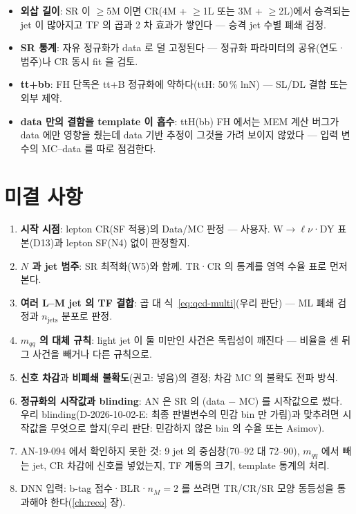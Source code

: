 \begin{note}
\begin{itemize}
\item \textbf{외삽 길이}: SR 이 $\ge5$M 이면 CR(4M + $\ge$1L 또는 3M + $\ge$2L)에서 승격되는 jet 이 많아지고 TF 의 곱과 2 차 효과가 쌓인다 — 승격 jet 수별 폐쇄 검정.
\item \textbf{SR 통계}: 자유 정규화가 data 로 덜 고정된다 — 정규화 파라미터의 공유(연도·범주)나 CR 동시 fit 을 검토.
\item \textbf{tt+bb}: FH 단독은 tt+B 정규화에 약하다(ttH: 50\,\% lnN) — SL/DL 결합 또는 외부 제약.
\item \textbf{data 만의 결함을 template 이 흡수}: ttH(bb) FH 에서는 MEM 계산 버그가 data 에만 영향을 줬는데 data 기반 추정이 그것을 가려 보이지 않았다
       — 입력 변수의 MC–data 를 따로 점검한다.
\end{itemize}
\end{note}

\section{미결 사항}\label{sec:qcd-open}
\begin{openq}
\begin{enumerate}
\item \textbf{시작 시점}: lepton CR(SF 적용)의 Data/MC 판정 — 사용자. W$\to\ell\nu$·DY 표본(D13)과 lepton SF(N4) 없이 판정할지.
\item \textbf{$N$ 과 jet 범주}: SR 최적화(W5)와 함께. TR·CR 의 통계를 영역 수율 표로 먼저 본다.
\item \textbf{여러 L–M jet 의 TF 결합}: 곱 대 식~\eqref{eq:qcd-multi}(우리 판단) — ML 폐쇄 검정과 $n_{\text{jets}}$ 분포로 판정.
\item \textbf{$m_{qq}$ 의 대체 규칙}: light jet 이 둘 미만인 사건은 독립성이 깨진다 — 비율을 센 뒤 그 사건을 빼거나 다른 규칙으로.
\item \textbf{신호 차감}과 \textbf{비폐쇄 불확도}(권고: 넣음)의 결정; 차감 MC 의 불확도 전파 방식.
\item \textbf{정규화의 시작값과 blinding}: AN 은 SR 의 (data $-$ MC) 를 시작값으로 썼다. 우리 blinding(D-2026-10-02-E: 최종 판별변수의 민감 bin 만 가림)과 맞추려면
      시작값을 무엇으로 할지(우리 판단: 민감하지 않은 bin 의 수율 또는 Asimov).
\item AN-19-094 에서 확인하지 못한 것: 9 jet 의 중심창(70–92 대 72–90), $m_{qq}$ 에서 빼는 jet, CR 차감에 신호를 넣었는지, TF 계통의 크기, template 통계의 처리.
\item DNN 입력: b-tag 점수·BLR·$n_M=2$ \chisq{} 를 쓰려면 TR/CR/SR 모양 동등성을 통과해야 한다(\ref{ch:reco} 장).
\end{enumerate}
\end{openq}
